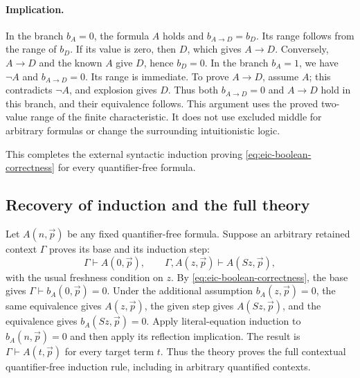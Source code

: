 \documentclass[11pt,letterpaper]{article}
\theoremstyle{definition}\newtheorem{definition}[theorem]{Definition}
\theoremstyle{remark}\newtheorem{remark}[theorem]{Remark}
\begin{document}
\paragraph{Implication.}
In the branch $b_A=0$, the formula $A$ holds and
$b_{A\to D}=b_D$.  Its range follows from the range of $b_D$.
If its value is zero, then $D$, which gives $A\to D$.  Conversely,
$A\to D$ and the known $A$ give $D$, hence $b_D=0$.
In the branch $b_A=1$, we have $\neg A$ and
$b_{A\to D}=0$.  Its range is immediate.  To prove $A\to D$,
assume $A$; this contradicts $\neg A$, and explosion gives $D$.
Thus both $b_{A\to D}=0$ and $A\to D$ hold in this branch, and
their equivalence follows.  This argument uses the proved two-value
range of the finite characteristic.  It does not use excluded middle
for arbitrary formulas or change the surrounding intuitionistic logic.

This completes the external syntactic induction proving
\eqref{eq:eic-boolean-correctness} for every quantifier-free formula.

\subsection{Recovery of induction and the full theory}

Let $A(n,\vec p)$ be any fixed quantifier-free formula.  Suppose an
arbitrary retained context $\Gamma$ proves its base and its induction
step:
\[
 \Gamma\vdash A(0,\vec p),
 \qquad
 \Gamma,A(z,\vec p)\vdash A(Sz,\vec p),
\]
with the usual freshness condition on $z$.  By
\eqref{eq:eic-boolean-correctness}, the base gives
$\Gamma\vdash b_A(0,\vec p)=0$.  Under the additional assumption
$b_A(z,\vec p)=0$, the same equivalence gives $A(z,\vec p)$,
the given step gives $A(Sz,\vec p)$, and the equivalence gives
$b_A(Sz,\vec p)=0$.  Apply literal-equation induction to
$b_A(n,\vec p)=0$ and then apply its reflection implication.
The result is $\Gamma\vdash A(t,\vec p)$ for every target term $t$.
Thus the theory proves the full contextual quantifier-free induction
rule, including in arbitrary quantified contexts.
\end{document}
